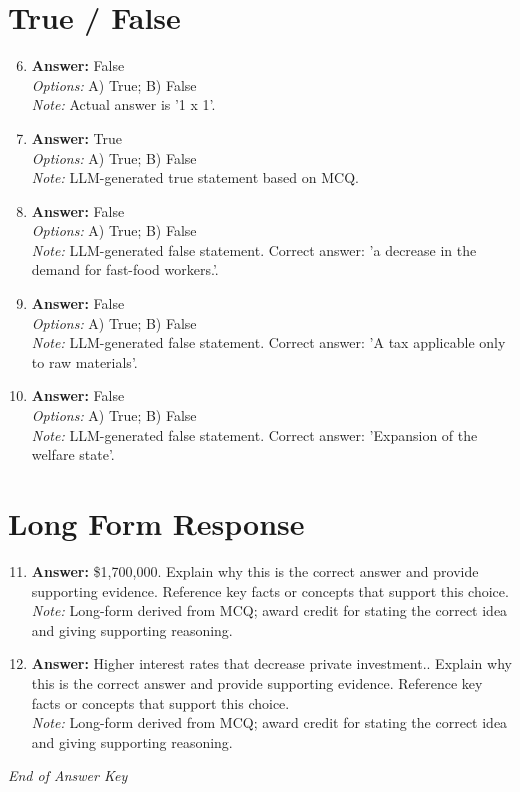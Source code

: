 \documentclass[12pt]{article}
\begin{document}
\section*{True / False}
\begin{enumerate}[label=\arabic*.]
\setcounter{enumi}{5}
\item \textbf{Answer:} False
\\ \textit{Options:} A) True; B) False
\\ \textit{Note:} Actual answer is '1 x 1'.
\item \textbf{Answer:} True
\\ \textit{Options:} A) True; B) False
\\ \textit{Note:} LLM-generated true statement based on MCQ.
\item \textbf{Answer:} False
\\ \textit{Options:} A) True; B) False
\\ \textit{Note:} LLM-generated false statement. Correct answer: 'a decrease in the demand for fast-food workers.'.
\item \textbf{Answer:} False
\\ \textit{Options:} A) True; B) False
\\ \textit{Note:} LLM-generated false statement. Correct answer: 'A tax applicable only to raw materials'.
\item \textbf{Answer:} False
\\ \textit{Options:} A) True; B) False
\\ \textit{Note:} LLM-generated false statement. Correct answer: 'Expansion of the welfare state'.
\end{enumerate}

\section*{Long Form Response}
\begin{enumerate}[label=\arabic*.]
\setcounter{enumi}{10}
\item \textbf{Answer:} \$1,700,000. Explain why this is the correct answer and provide supporting evidence. Reference key facts or concepts that support this choice.
\\ \textit{Note:} Long-form derived from MCQ; award credit for stating the correct idea and giving supporting reasoning.
\item \textbf{Answer:} Higher interest rates that decrease private investment.. Explain why this is the correct answer and provide supporting evidence. Reference key facts or concepts that support this choice.
\\ \textit{Note:} Long-form derived from MCQ; award credit for stating the correct idea and giving supporting reasoning.
\end{enumerate}

\vfill
\noindent\textit{End of Answer Key}
\end{document}
